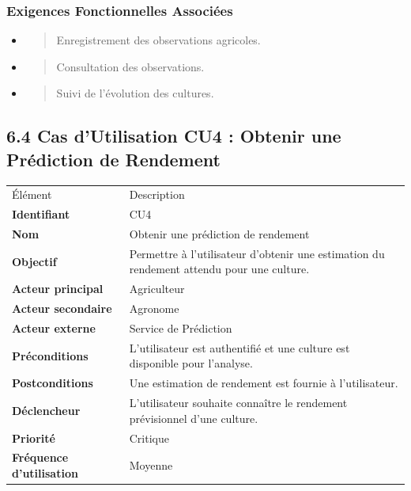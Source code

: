 \documentclass[
]{article}
\begin{document}
\hypertarget{exigences-fonctionnelles-associuxe9es-2}{%
\subsubsection{Exigences Fonctionnelles
Associées}\label{exigences-fonctionnelles-associuxe9es-2}}

\begin{itemize}
\item
  \begin{quote}
  Enregistrement des observations agricoles.
  \end{quote}
\item
  \begin{quote}
  Consultation des observations.
  \end{quote}
\item
  \begin{quote}
  Suivi de l'évolution des cultures.
  \end{quote}
\end{itemize}

\hypertarget{cas-dutilisation-cu4-obtenir-une-pruxe9diction-de-rendement}{%
\subsection{6.4 Cas d'Utilisation CU4 : Obtenir une Prédiction de
Rendement}\label{cas-dutilisation-cu4-obtenir-une-pruxe9diction-de-rendement}}

\begin{longtable}[]{@{}ll@{}}
\toprule
\endhead
Élément & Description \\
\textbf{Identifiant} & CU4 \\
\textbf{Nom} & Obtenir une prédiction de rendement \\
\textbf{Objectif} & Permettre à l'utilisateur d'obtenir une estimation
du rendement attendu pour une culture. \\
\textbf{Acteur principal} & Agriculteur \\
\textbf{Acteur secondaire} & Agronome \\
\textbf{Acteur externe} & Service de Prédiction \\
\textbf{Préconditions} & L'utilisateur est authentifié et une culture
est disponible pour l'analyse. \\
\textbf{Postconditions} & Une estimation de rendement est fournie à
l'utilisateur. \\
\textbf{Déclencheur} & L'utilisateur souhaite connaître le rendement
prévisionnel d'une culture. \\
\textbf{Priorité} & Critique \\
\textbf{Fréquence d'utilisation} & Moyenne \\
\bottomrule
\end{longtable}
\end{document}
